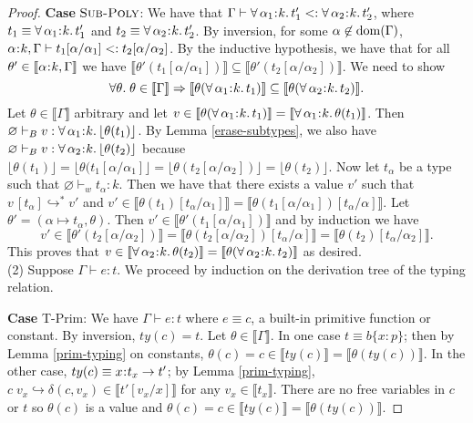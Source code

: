 \documentclass[11pt]{article}
\newcommand{\al}{\alpha}
\newcommand{\bind}{\hspace{0.05em}{:}\hspace{0.05em}} %
\newcommand{\col}{\mathbin{:}}       %
\newcommand{\lb}{\llbracket}         %
\newcommand{\rb}{\rrbracket}         %
\newcommand{\step}{\hookrightarrow}
\newcommand{\many}{\hookrightarrow^*}
\newcommand{\polytype}[3]{\forall\, #1\bind #2.\, #3}
\newcommand{\functype}[3]{#1\bind #2 \rightarrow #3}
\newcommand{\dom}[1]{{\rm dom}(#1)}
\begin{document}
\begin{proof}
{\bf Case} $\textsc{Sub-Poly}$: We have that
$\Gamma \vdash \polytype{\al_1}{k}{t'_1} <: \polytype{\al_2}{k}{t'_2}$, where $t_1 \equiv \polytype{\al_1}{k}{t'_1}$ and $t_2 \equiv \polytype{\al_2}{k}{t'_2}$.
By inversion, for some $\al\not\in\dom{\Gamma}$, $\al\bind k,\Gamma \vdash t_1[\al/\al_1] <: t_2 [\al/\al_2]$.
By the inductive hypothesis, we have that for all $\theta' \in \lb \al\bind k, \Gamma\rb$ we have 
$\lb \theta'(t_1[\al/\al_1]) \rb \subseteq \lb \theta'( t_2[\al/\al_2] )\rb$.
We need to show \[\forall\theta.\; \theta \in \lb\Gamma\rb \Rightarrow \lb \theta(\polytype{\al_1}{k}{t_1})\rb \subseteq \lb \theta(\polytype{\al_2}{k}{t_2})\rb.\] 
Let $\theta \in \lb\Gamma\rb$ arbitrary and let $v \in \lb\theta( \polytype{\al_1}{k}{t_1})\rb = \lb\polytype{\al_1}{k}{\theta(t_1)}\rb$. Then $\varnothing \vdash_B v : \polytype{\al_1}{k}{\lfloor \theta(t_1) \rfloor}$. By Lemma \ref{erase-subtypes}, we also have $\varnothing \vdash_B v : \polytype{\al_2}{k}{\lfloor \theta(t_2) \rfloor}$ because $\lfloor \theta(t_1) \rfloor = \lfloor \theta(t_1[\al/\al_1]\rfloor = \lfloor \theta(t_2[\al/\al_2]) \rfloor = \lfloor \theta(t_2) \rfloor$. 
Now let $t_\al$ be a type such that $\varnothing \vdash_w t_\al : k$. Then we have that there exists a value $v'$ such that 
$v\, [t_\al] \many v'$ and $v' \in \lb \theta(t_1)[t_\al/\al_1]\rb = \lb\theta(t_1[\al/\al_1])[t_\al/\al]\rb.$
Let $\theta' = (\al \mapsto t_\al, \theta)$. Then $v' \in \lb\theta'(t_1[\al/\al_1])\rb$ and by induction we have
\[
v' \in \lb\theta'(t_2[\al/\al_2])\rb = \lb\theta(t_2[\al/\al_2])[t_\al/\al]\rb = \lb \theta(t_2)[t_\al/\al_2]\rb.
\]
This proves that $v \in \lb\polytype{\al_2}{k}{\theta(t_2)}\rb = \lb\theta(\polytype{\al_2}{k}{t_2})\rb$ as desired.\\

(2) Suppose $\Gamma \vdash e : t$. %
We proceed by induction on the derivation tree of the typing relation. 

{\bf Case} {\sc T-Prim}: We have $\Gamma \vdash e : t$ where $e \equiv c$, a built-in primitive function or constant. By inversion, $ty(c) = t$. Let $\theta \in \lb \Gamma \rb$.
In one case $t \equiv b\{x\col p\}$; then by Lemma \ref{prim-typing} on constants, $\theta(c) = c \in \lb ty(c)\rb = \lb \theta(ty(c))\rb$. In the other case, $ty(c) \equiv \functype{x}{t_x}{t'}$; by Lemma \ref{prim-typing},
$c\; v_x \step \delta(c,v_x) \in \lb t'[v_x/x]\rb$ for any $v_x \in \lb t_x\rb.$ There are no free variables in $c$ or $t$ so $\theta(c)$ is a value and $\theta(c) = c \in \lb ty(c)\rb = \lb\theta(ty(c))\rb$.



\end{proof}
\end{document}
